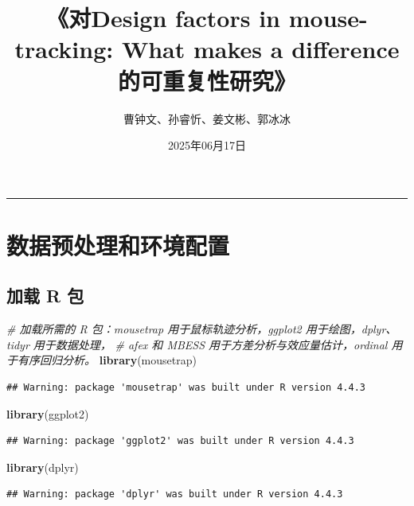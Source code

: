 \documentclass[
]{article}
\title{《对Design factors in mouse-tracking: What makes a
difference的可重复性研究》}
\author{曹钟文、孙睿忻、姜文彬、郭冰冰}
\date{2025年06月17日}
\newenvironment{Shaded}{\begin{snugshade}}{\end{snugshade}}
\newcommand{\CommentTok}[1]{\textcolor[rgb]{0.56,0.35,0.01}{\textit{#1}}}
\newcommand{\FunctionTok}[1]{\textcolor[rgb]{0.13,0.29,0.53}{\textbf{#1}}}
\newcommand{\NormalTok}[1]{#1}
\begin{document}
\maketitle

\newpage

\begin{center}\rule{0.5\linewidth}{0.5pt}\end{center}

\section{数据预处理和环境配置}\label{ux6570ux636eux9884ux5904ux7406ux548cux73afux5883ux914dux7f6e}

\subsection{加载 R 包}\label{ux52a0ux8f7d-r-ux5305}

\begin{Shaded}
\begin{Highlighting}[]
\CommentTok{\# 加载所需的 R 包：mousetrap 用于鼠标轨迹分析，ggplot2 用于绘图，dplyr、tidyr 用于数据处理，}
\CommentTok{\# afex 和 MBESS 用于方差分析与效应量估计，ordinal 用于有序回归分析。}
\FunctionTok{library}\NormalTok{(mousetrap)}
\end{Highlighting}
\end{Shaded}

\begin{verbatim}
## Warning: package 'mousetrap' was built under R version 4.4.3
\end{verbatim}

\begin{Shaded}
\begin{Highlighting}[]
\FunctionTok{library}\NormalTok{(ggplot2)}
\end{Highlighting}
\end{Shaded}

\begin{verbatim}
## Warning: package 'ggplot2' was built under R version 4.4.3
\end{verbatim}

\begin{Shaded}
\begin{Highlighting}[]
\FunctionTok{library}\NormalTok{(dplyr)}
\end{Highlighting}
\end{Shaded}

\begin{verbatim}
## Warning: package 'dplyr' was built under R version 4.4.3
\end{verbatim}
\end{document}
